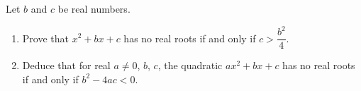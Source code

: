 Let $b$ and $c$ be real numbers.
\begin{enumerate}
\item[(a)] Prove that $x^2+bx+c$ has no real roots if and only if $c>\dfrac{b^2}{4}$.
\item[(b)] Deduce that for real $a\ne0$, $b$, $c$, the quadratic $ax^2+bx+c$ has no real roots if and only if $b^2-4ac<0$.
\end{enumerate}
